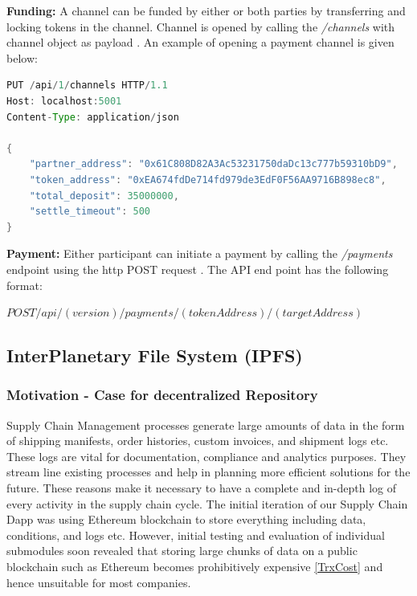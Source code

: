 \textbf{Funding:} A channel can be funded by either or both parties by transferring and locking tokens in the channel. Channel is opened by calling the \textit{/channels} with channel object as payload \cite{rad:001}. An example of opening a payment channel is given below: 
\begin{lstlisting}[language=Java,frame=single,tabsize=2,showspaces=false,showstringspaces=false,
  keywordstyle=\color{blue},morekeywords={function,returns,constant,memory},caption={Opening a Payement Channel on Raiden \cite{rad:001}}]
PUT /api/1/channels HTTP/1.1
Host: localhost:5001
Content-Type: application/json

{
    "partner_address": "0x61C808D82A3Ac53231750daDc13c777b59310bD9",
    "token_address": "0xEA674fdDe714fd979de3EdF0F56AA9716B898ec8",
    "total_deposit": 35000000,
    "settle_timeout": 500
}
\end{lstlisting}
\textbf{Payment:} Either participant can initiate a payment by calling the \textit{/payments} endpoint using the http POST request \cite{rad:001}. The API end point has the following format:

\textbf{$POST /api/(version)/payments/(tokenAddress)/(targetAddress)$} \cite{rad:001}

\vspace{0.5cm}
\subsection{InterPlanetary File System (IPFS)} \label{IPFS}
\subsubsection{Motivation - Case for decentralized Repository} \label{motivation}
Supply Chain Management processes generate large amounts of data in the form of shipping manifests, order histories, custom invoices, and shipment logs etc. These logs are vital for documentation, compliance and analytics purposes. They stream line existing processes and help in planning more efficient solutions for the future. These reasons make it necessary to have a complete and in-depth log of every activity in the supply chain cycle. The initial iteration of our Supply Chain Dapp was using Ethereum blockchain to store everything including data, conditions, and logs etc. However, initial testing and evaluation of individual submodules soon revealed that storing large chunks of data on a public blockchain such as Ethereum becomes prohibitively expensive \ref{TrxCost} and hence unsuitable for most companies.
\vspace{0.5cm}
